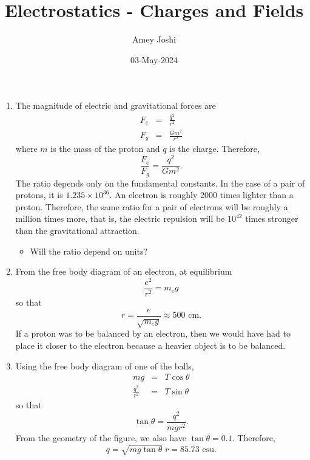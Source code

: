 \documentclass{article}
\begin{document}
\title{Electrostatics - Charges and Fields}
\author{Amey Joshi}
\date{03-May-2024}
\maketitle
\begin{enumerate}
\item The magnitude of electric and gravitational forces are
\begin{eqnarray}
F_e &=& \frac{q^2}{r^2} \label{e1} \\
F_g &=& \frac{Gm^2}{r^2} \label{e2}
\end{eqnarray}
where $m$ is the mass of the proton and $q$ is the charge. Therefore,
\[
\frac{F_e}{F_g} = \frac{q^2}{Gm^2}.
\]
The ratio depends only on the fundamental constants. In the case of a pair of
protons, it is $1.235 \times 10^{36}$. An electron is roughly $2000$ times lighter
than a proton. Therefore, the same ratio for a pair of electrons will be roughly
a million times more, that is, the electric repulsion will be $10^{42}$ times
stronger than the gravitational attraction.

\begin{itemize}
\item Will the ratio depend on units?
\end{itemize}

\item From the free body diagram of an electron, at equilibrium 
\begin{equation}\label{e3}
\frac{e^2}{r^2} = m_eg
\end{equation}
so that
\begin{equation}\label{e4}
r = \frac{e}{\sqrt{m_e g}} \approx 500 \text{ cm}.
\end{equation}
If a proton was to be balanced by an electron, then we would have had to place it
closer to the electron because a heavier object is to be balanced.

\item Using the free body diagram of one of the balls,
\begin{eqnarray}
mg &=& T\cos\theta \label{e5} \\
\frac{q^2}{r^2} &=& T\sin\theta \label{e6}
\end{eqnarray}
so that
\[
\tan\theta = \frac{q^2}{mgr^2}.
\]
From the geometry of the figure, we also have $\tan\theta = 0.1$. Therefore,
\begin{equation}\label{e7}
q = \sqrt{mg\tan\theta}\; r = 85.73 \text{ esu}. 
\end{equation}


\end{enumerate}
\end{document}
